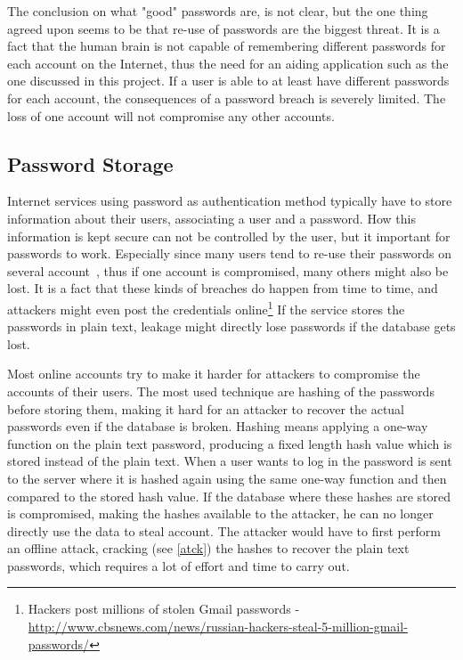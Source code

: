 \par The conclusion on what "good" passwords are, is not clear, but the one thing agreed upon seems to be that re-use of passwords are the biggest threat. It is a fact that the human brain is not capable of remembering different passwords for each account on the Internet, thus the need for an aiding application such as the one discussed in this project. If a user is able to at least have different passwords for each account, the consequences of a password breach is severely limited. The loss of one account will not compromise any other accounts. 

\subsection{Password Storage}\label{pw-storage}
Internet services using password as authentication method typically have to store information about their users, associating a user and a password. How this information is kept secure can not be controlled by the user, but it important for passwords to work. Especially since many users tend to re-use their passwords on several account~\cite{domino-effect}, thus if one account is compromised, many others might also be lost. It is a fact that these kinds of breaches do happen from time to time, and attackers might even post the credentials online\footnote{Hackers post millions of stolen Gmail passwords - \url{http://www.cbsnews.com/news/russian-hackers-steal-5-million-gmail-passwords/} } If the service stores the passwords in plain text, leakage might directly lose passwords if the database gets lost.
\par Most online accounts try to make it harder for attackers to compromise the accounts of their users. The most used technique are hashing of the passwords before storing them, making it hard for an attacker to recover the actual passwords even if the database is broken. Hashing means applying a one-way function on the plain text password, producing a fixed length hash value which is stored instead of the plain text. When a user wants to log in the password is sent to the server where it is hashed again using the same one-way function and then compared to the stored hash value. If the database where these hashes are stored is compromised, making the hashes available to the attacker, he can no longer directly use the data to steal account. The attacker would have to first perform an offline attack, cracking (see \autoref{atck}) the hashes to recover the plain text passwords, which requires a lot of effort and time to carry out. 
